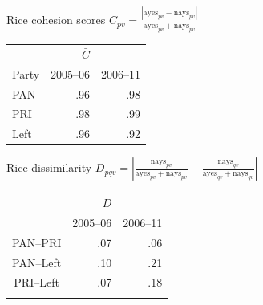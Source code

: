 \documentclass[bigger]{beamer}
\begin{document}
\begin{frame}[label={sec:org5d1ea20}]{Rice cohesion scores}
\centering
\(C_{pv} = \frac{\left|\text{ayes}_{pv} - \text{nays}_{pv}\right|}{\text{ayes}_{pv} + \text{nays}_{pv}}\)
\bigskip
\begin{center}
\begin{tabular}{lrr}
 & \(\bar{C}\) & \\
Party & 2005--06 & 2006--11\\
\hline
PAN & .96 & .98\\
PRI & .98 & .99\\
Left & .96 & .92\\
\end{tabular}
\end{center}
\end{frame}
\begin{frame}[label={sec:orgf0c4e09}]{Rice dissimilarity}
\centering
\(D_{pqv} = \left|\frac{\text{nays}_{pv}}{\text{ayes}_{pv} + \text{nays}_{pv}} - \frac{\text{nays}_{qv}}{\text{ayes}_{qv} + \text{nays}_{qv}}\right|\)

\bigskip
\begin{center}
\begin{tabular}{crr}
 & \(\bar{D}\) & \\
 & 2005--06 & 2006--11\\
\hline
PAN--PRI & .07 & \alert{.06}\\
PAN--Left & .10 & \alert{.21}\\
PRI--Left & .07 & \alert{.18}\\
 &  & \\
\end{tabular}
\end{center}
\end{frame}
\end{document}
